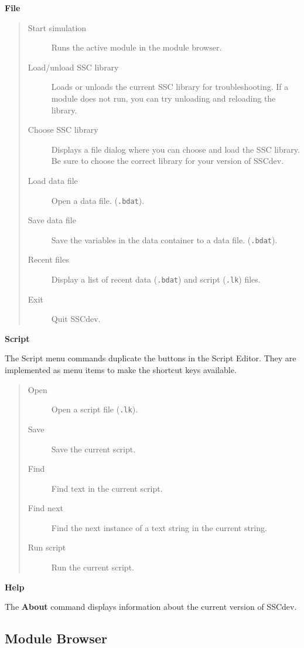 \documentclass{article}
\begin{document}
\textbf{File}
\begin{quote}
\begin{description}
\item[Start simulation] Runs the active module in the module browser.
\item[Load/unload SSC library] Loads or unloads the current SSC library for troubleshooting. If a module does not run, you can try unloading and reloading the library.
\item[Choose SSC library] Displays a file dialog where you can choose and load the SSC library. Be sure to choose the correct library for your version of SSCdev.
\item[Load data file] Open a data file. (\texttt{.bdat}).
\item[Save data file] Save the variables in the data container to a data file. (\texttt{.bdat}).
\item[Recent files] Display a list of recent data (\texttt{.bdat}) and script (\texttt{.lk}) files.
\item[Exit] Quit SSCdev.
\end{description}
\end{quote}

\textbf{Script}

The Script menu commands duplicate the buttons in the Script Editor. They are implemented as menu items to make the shortcut keys available.

\begin{quote}
\begin{description}
\item[Open] Open a script file (\texttt{.lk}).
\item[Save] Save the current script.
\item[Find] Find text in the current script.
\item[Find next] Find the next instance of a text string in the current string.
\item[Run script] Run the current script. 
\end{description}
\end{quote}

\textbf{Help}

The \textbf{About} command displays information about the current version of SSCdev.

\subsection{Module Browser}
\label{sec_module_browser}
\end{document}
